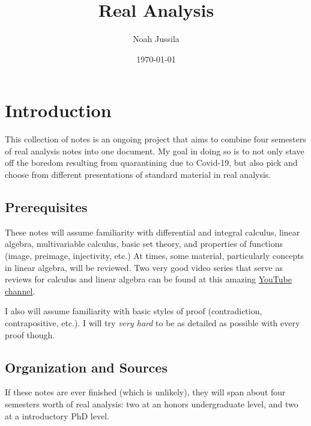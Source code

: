 \documentclass{article}
\title{Real Analysis}
\author{Noah Jussila}
\date{\today}
\theoremstyle{definition}
\begin{document}
	\maketitle
	
	\tableofcontents
	
	\section{Introduction}
	This collection of notes is an ongoing project that aims to combine four semesters of real analysis notes into one document. My goal in doing so is to not only stave off the boredom resulting from quarantining due to Covid-19, but also pick and choose from different presentations of standard material in real analysis. 
	\subsection{Prerequisites}
	These notes will assume familiarity with differential and integral calculus, linear algebra, multivariable calculus, basic set theory, and properties of functions (image, preimage, injectivity, etc.) At times, some material, particularly concepts in linear algebra, will be reviewed. Two very good video series that serve as reviews for calculus and linear algebra can be found at this amazing \href{https://www.youtube.com/channel/UCYO_jab_esuFRV4b17AJtAw}{YouTube channel}.
	
	I also will assume familiarity with basic styles of proof (contradiction, contrapositive, etc.). I will try \textit{very hard} to be as detailed as possible with every proof though. 
	\subsection{Organization and Sources}
	If these notes are ever finished (which is unlikely), they will span about four semesters worth of real analysis: two at an honors undergraduate level, and two at a introductory PhD level. 
	
\end{document}
